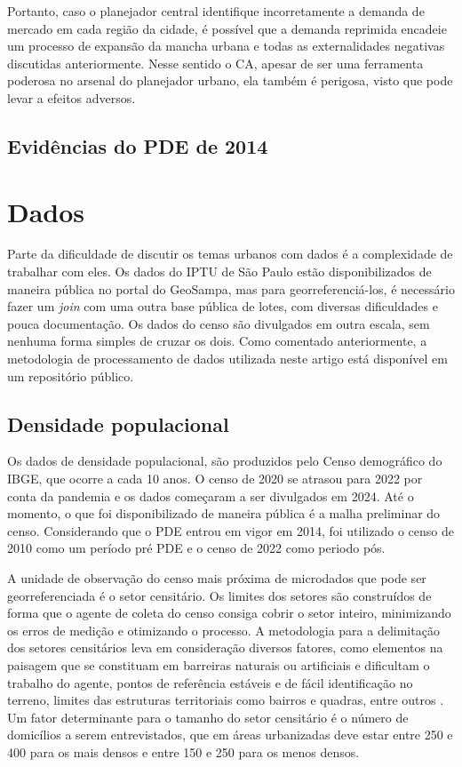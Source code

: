 Portanto, caso o planejador central identifique incorretamente a demanda de mercado em cada região da cidade, é possível que a demanda reprimida encadeie um processo de expansão da mancha urbana e todas as externalidades negativas discutidas anteriormente. Nesse sentido o CA, apesar de ser uma ferramenta poderosa no arsenal do planejador urbano, ela também é perigosa, visto que pode levar a efeitos adversos. 

\section{Evidências do PDE de 2014}


\chapter{Dados}
\label{chp:dados}

Parte da dificuldade de discutir os temas urbanos com dados é a complexidade de trabalhar com eles. Os dados do IPTU de São Paulo estão disponibilizados de maneira pública no portal do GeoSampa, mas para georreferenciá-los, é necessário fazer um \textit{join} com uma outra base pública de lotes, com diversas dificuldades e pouca documentação. Os dados do censo são divulgados em outra escala, sem nenhuma forma simples de cruzar os dois. Como comentado anteriormente, a metodologia de processamento de dados utilizada neste artigo está disponível em um repositório público.

\section{Densidade populacional}

Os dados de densidade populacional, são produzidos pelo Censo demográfico do IBGE, que ocorre a cada 10 anos. O censo de 2020 se atrasou para 2022 por conta da pandemia e os dados começaram a ser divulgados em 2024. Até o momento, o que foi disponibilizado de maneira pública é a malha preliminar do censo. Considerando que o PDE entrou em vigor em 2014, foi utilizado o censo de 2010 como um período pré PDE e o censo de 2022 como periodo pós.

A unidade de observação do censo mais próxima de microdados que pode ser georreferenciada é o setor censitário. Os limites dos setores são construídos de forma que o agente de coleta do censo consiga cobrir o setor inteiro, minimizando os erros de medição e otimizando o processo. A metodologia para a delimitação dos setores censitários leva em consideração diversos fatores, como elementos na paisagem que se constituam em barreiras naturais ou artificiais e dificultam o trabalho do agente, pontos de referência estáveis e de fácil identificação no terreno, limites das estruturas territoriais como bairros e quadras, entre outros \cite{IBGE2024}. Um fator determinante para o tamanho do setor censitário é o número de domicílios a serem entrevistados, que em áreas urbanizadas deve estar entre 250 e 400 para os mais densos e entre 150 e 250 para os menos densos.


